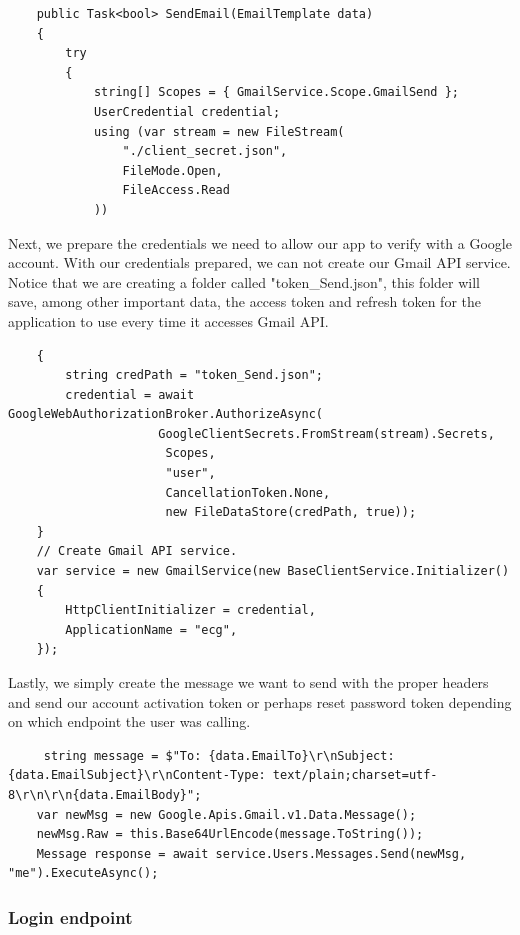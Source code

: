 \documentclass[singlespacing,12pt,parskip,headsepline,consistentlayout]{article}
\begin{document}
\begin{lstlisting}
    public Task<bool> SendEmail(EmailTemplate data)
    {
        try
        {
            string[] Scopes = { GmailService.Scope.GmailSend };
            UserCredential credential;
            using (var stream = new FileStream(
                "./client_secret.json",
                FileMode.Open,
                FileAccess.Read
            ))
\end{lstlisting}

Next, we prepare the credentials we need to allow our app to verify with a Google account. With our credentials prepared, we can not create our Gmail API service. Notice that we are creating a folder called "token\_Send.json", this folder will save, among other important data, the access token and refresh token for the application to use every time it accesses Gmail API.

\begin{lstlisting}
    {
        string credPath = "token_Send.json";
        credential = await GoogleWebAuthorizationBroker.AuthorizeAsync(
                     GoogleClientSecrets.FromStream(stream).Secrets,
                      Scopes,
                      "user",
                      CancellationToken.None,
                      new FileDataStore(credPath, true));
    }
    // Create Gmail API service.
    var service = new GmailService(new BaseClientService.Initializer()
    {
        HttpClientInitializer = credential,
        ApplicationName = "ecg",
    });
\end{lstlisting}

Lastly, we simply create the message we want to send with the proper headers and send our account activation token or perhaps reset password token depending on which endpoint the user was calling.

\begin{lstlisting}
     string message = $"To: {data.EmailTo}\r\nSubject: {data.EmailSubject}\r\nContent-Type: text/plain;charset=utf-8\r\n\r\n{data.EmailBody}";
    var newMsg = new Google.Apis.Gmail.v1.Data.Message();
    newMsg.Raw = this.Base64UrlEncode(message.ToString());
    Message response = await service.Users.Messages.Send(newMsg, "me").ExecuteAsync();
\end{lstlisting}

\pagebreak

\subsubsection{Login endpoint}
\end{document}
